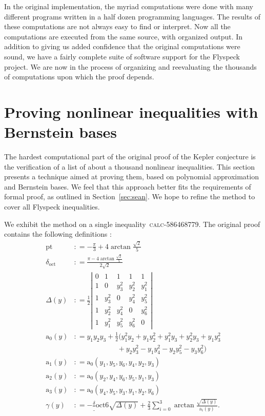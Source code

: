 \documentclass[11pt]{amsart}
\def\coloneq{\mathrel{\mathop:}=}
\def\sfrac#1#2{{\textstyle \frac {#1} {#2}}}
\def\calc#1{{\textsc{calc-#1}}}
\def\pt{\mathrm{pt}}
\def\doct{\delta_{\mathrm{oct}}}
\def\asolid{\mathrm{a}}
\begin{document}
In the original implementation, the myriad computations were done with
many different programs written in a half dozen programming languages.
The results of these computations are not always easy to find or
interpret.  Now all the computations are executed from the same
source, with organized output.  In addition to giving us added
confidence that the original computations were sound, we have a fairly
complete suite of software support for the Flyspeck project. We are
now in the process of organizing and reevaluating the thousands of
computations upon which the proof depends.

\section{Proving nonlinear inequalities with Bernstein bases}
\label{sec:zumkeller}


The hardest computational part of the original proof of the Kepler conjecture is the verification of a list of about a thousand nonlinear inequalities. This section presents a technique aimed at proving
them, based on polynomial approximation and Bernstein bases. We feel that
this approach better fits the requirements of formal proof, as outlined in
Section~\ref{sec:sean}.  We hope to refine the method to cover all Flyspeck
inequalities.

We exhibit the method on a single inequality~\calc{586468779}.
The original proof contains the following definitions \cite{sp1}:
\begin{align*}
  \pt &\coloneq - \frac \pi 3 + 4 \arctan \frac{\sqrt 2}5 \\
\doct &\coloneq \frac {\pi - 4 \arctan \frac{\sqrt 2}5}{2 \sqrt 2}\\
\Delta(y) &\coloneq \frac 1 2
  \left|
  \begin{array}{ccccc}
0 & 1 & 1 & 1 & 1 \\
   1 & 0 & y_3^2 & y_2^2 & y_1^2 \\
   1 & y_3^2 & 0 & y_4^2 & y_5^2 \\
   1 & y_2^2 & y_4^2 & 0 & y_6^2 \\
   1 & y_1^2 & y_5^2 & y_6^2 & 0
  \end{array}
  \right|\\
\asolid_0(y) &\coloneq y_1 y_2 y_3 + \sfrac 1 2 (
y_1^2 y_2 + y_1 y_2^2 + y_1^2 y_3 + y_2^2 y_3 + y_1 y_3^2 \\
&\qquad\qquad\qquad {} + y_2 y_3^2 - y_1 y_4^2 - y_2 y_5^2 - y_3 y_6^2)\\
\asolid_1(y) &\coloneq \asolid_0 (y_1, y_5, y_6, y_4, y_2, y_3)\\
\asolid_2(y) &\coloneq \asolid_0 (y_2, y_4, y_6, y_5, y_1, y_3)\\
\asolid_3(y) &\coloneq \asolid_0 (y_4, y_5, y_3, y_1, y_2, y_6)\\
\gamma(y) &\coloneq 
- \frac \doct 6 \sqrt {\Delta(y)} + \frac 2 3 \sum_{i=0}^3 \arctan \frac
{\sqrt{\Delta(y)}} {\asolid_i(y)}.
\end{align*}
\end{document}
